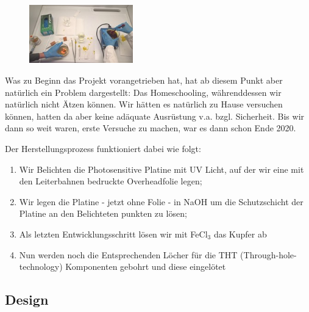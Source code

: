 \documentclass{scrartcl}
\begin{document}
        \begin{figure}
        \vspace{-25pt}
        \begin{center}
        \includegraphics[width=0.4\textwidth,angle=0]{Handy/WP_20210704_20_40_03_Pro} %
        \end{center}
        \vspace{-20pt}
        \end{figure}

    Was zu Beginn das Projekt vorangetrieben hat, hat ab diesem Punkt aber natürlich ein Problem dargestellt:
    Das Homeschooling, währenddessen wir natürlich nicht Ätzen können.
    Wir hätten es natürlich zu Hause versuchen können, hatten da aber keine adäquate Ausrüstung v.a. bzgl. Sicherheit.
    Bis wir dann so weit waren, erste Versuche zu machen, war es dann schon Ende 2020.

    Der Herstellungsprozess funktioniert dabei wie folgt:
    \vspace{-10pt}
    \begin{enumerate}
        \item Wir Belichten die Photosensitive Platine mit UV Licht, auf der wir eine mit den Leiterbahnen bedruckte Overheadfolie legen;
        \vspace{-12pt}
        \item Wir legen die Platine - jetzt ohne Folie - in NaOH um die Schutzschicht der Platine an den Belichteten punkten zu lösen;
        \vspace{-12pt}
        \item Als letzten Entwicklungsschritt lösen wir mit FeCl$_3$ das Kupfer ab
        \vspace{-12pt}
        \item Nun werden noch die Entsprechenden Löcher für die THT (Through-hole-technology) Komponenten gebohrt und diese eingelötet
    \end{enumerate}


    \subsection{Design}
    \vspace{-15pt}
\end{document}
